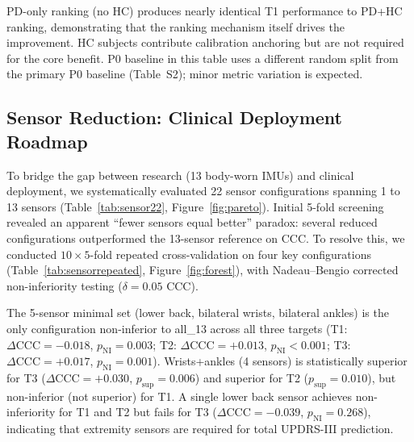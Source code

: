 \documentclass[11pt,a4paper]{article}
\newcommand{\tabnote}[1]{\par\vspace{2pt}\noindent\begin{minipage}{\linewidth}\small\itshape\raggedright #1\par\end{minipage}\par\vspace{0.4em}}
\begin{document}
\begin{table}[H]
\centering
\caption{HC ablation: contribution of healthy controls to ordinal ranking (5-fold CV).}
\label{tab:hc}
\small
{}%
\tabnote{PD-only ranking (no HC) produces nearly identical T1 performance to PD+HC ranking, demonstrating that the ranking mechanism itself drives the improvement. HC subjects contribute calibration anchoring but are not required for the core benefit. P0 baseline in this table uses a different random split from the primary P0 baseline (Table~S2); minor metric variation is expected.}
\end{table}

\subsection{Sensor Reduction: Clinical Deployment Roadmap}

To bridge the gap between research (13 body-worn IMUs) and clinical deployment, we systematically evaluated 22 sensor configurations spanning 1 to 13 sensors (Table~\ref{tab:sensor22}, Figure~\ref{fig:pareto}). Initial 5-fold screening revealed an apparent ``fewer sensors equal better'' paradox: several reduced configurations outperformed the 13-sensor reference on CCC. To resolve this, we conducted $10\times 5$-fold repeated cross-validation on four key configurations (Table~\ref{tab:sensorrepeated}, Figure~\ref{fig:forest}), with Nadeau--Bengio corrected non-inferiority testing ($\delta=0.05$ CCC).

The 5-sensor minimal set (lower back, bilateral wrists, bilateral ankles) is the only configuration non-inferior to all\_13 across all three targets (T1: $\Delta\mathrm{CCC}=-0.018$, $p_{\mathrm{NI}}=0.003$; T2: $\Delta\mathrm{CCC}=+0.013$, $p_{\mathrm{NI}}<0.001$; T3: $\Delta\mathrm{CCC}=+0.017$, $p_{\mathrm{NI}}=0.001$). Wrists+ankles (4 sensors) is statistically superior for T3 ($\Delta\mathrm{CCC}=+0.030$, $p_{\mathrm{sup}}=0.006$) and superior for T2 ($p_{\mathrm{sup}}=0.010$), but non-inferior (not superior) for T1. A single lower back sensor achieves non-inferiority for T1 and T2 but fails for T3 ($\Delta\mathrm{CCC}=-0.039$, $p_{\mathrm{NI}}=0.268$), indicating that extremity sensors are required for total UPDRS-III prediction.
\end{document}
